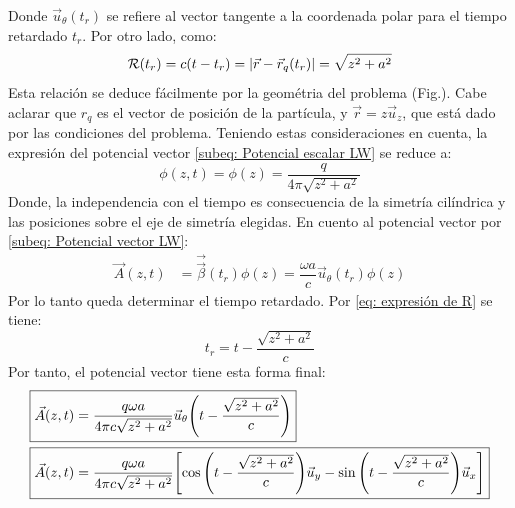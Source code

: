 \documentclass[11 pt]{article}
\begin{document}
Donde $\vec{u}_\theta (t_r)$ se refiere al vector tangente a la coordenada polar para el tiempo retardado $t_r$. Por otro lado, como: 
\begin{equation}
    \mathcal{R}(t_r) = c(t-t_r) =\qty|\vec{r} - \vec{r}_q(t_r)| = \sqrt{z^2 + a^2}\label{eq: expresión de R}
\end{equation}
Esta relación se deduce fácilmente por la geométria del problema (Fig.). Cabe aclarar que  $r_q$ es el vector de posición de la partícula, y $\vec{r} = z \vec{u}_z$, que está dado por las condiciones del problema. Teniendo estas consideraciones en cuenta, la expresión del potencial vector \eqref{subeq: Potencial escalar LW} se reduce a: 
\begin{equation}
    \boxed{\phi(z,t) = \phi(z) = \dfrac{q}{4\pi \sqrt{z^2 + a^2}}}
\end{equation}
Donde, la independencia con el tiempo es consecuencia de la simetría cilíndrica y las posiciones sobre el eje de simetría elegidas. En cuento al potencial vector por \eqref{subeq: Potencial vector LW}: 
\begin{align}
\vec{A}(z,t) &= \vec{\vec{\beta}}(t_r)\phi(z) = \dfrac{\omega a }{c}\vec{u}_\theta(t_r)\phi(z)\label{eq: potencial vector, preliminar}
\end{align}
Por lo tanto queda determinar el tiempo retardado. Por \eqref{eq: expresión de R} se tiene: 
\begin{equation}
    t_r = t - \dfrac{\sqrt{z^2 + a^2}}{c}\label{eq: tiempo retardado}
\end{equation}
Por tanto, el potencial vector tiene esta forma final: 
\begin{align}
    &\boxed{\vec{A}(z,t) = \dfrac{q\omega a}{4\pi c\sqrt{z^2 + a^2}}\vec{u}_\theta \qty(t - \dfrac{\sqrt{z^2 + a^2}}{c})}\\ 
    &\boxed{\vec{A}(z,t) = \dfrac{q\omega a}{4\pi c\sqrt{z^2 + a^2}}\qty[\cos\qty(t - \dfrac{\sqrt{z^2 + a^2}}{c})\vec{u}_y - \sin\qty(t - \dfrac{\sqrt{z^2 + a^2}}{c})\vec{u}_x]}
\end{align}
\end{document}

